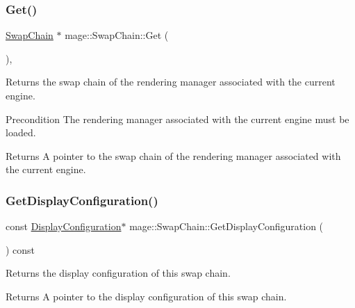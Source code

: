 \subsubsection{\texorpdfstring{Get()}{Get()}}
{\footnotesize\ttfamily \hyperlink{classmage_1_1_swap_chain}{Swap\+Chain} $\ast$ mage\+::\+Swap\+Chain\+::\+Get (\begin{DoxyParamCaption}{ }\end{DoxyParamCaption})\hspace{0.3cm}{\ttfamily [static]}, {\ttfamily [noexcept]}}

Returns the swap chain of the rendering manager associated with the current engine.

\begin{DoxyPrecond}{Precondition}
The rendering manager associated with the current engine must be loaded. 
\end{DoxyPrecond}
\begin{DoxyReturn}{Returns}
A pointer to the swap chain of the rendering manager associated with the current engine. 
\end{DoxyReturn}
\hypertarget{classmage_1_1_swap_chain_afb7cf408081f09d0241f3e764a047e74}{}\label{classmage_1_1_swap_chain_afb7cf408081f09d0241f3e764a047e74} 
\subsubsection{\texorpdfstring{Get\+Display\+Configuration()}{GetDisplayConfiguration()}}
{\footnotesize\ttfamily const \hyperlink{classmage_1_1_display_configuration}{Display\+Configuration}$\ast$ mage\+::\+Swap\+Chain\+::\+Get\+Display\+Configuration (\begin{DoxyParamCaption}{ }\end{DoxyParamCaption}) const\hspace{0.3cm}{\ttfamily [noexcept]}}

Returns the display configuration of this swap chain.

\begin{DoxyReturn}{Returns}
A pointer to the display configuration of this swap chain. 
\end{DoxyReturn}
\hypertarget{classmage_1_1_swap_chain_a0b54dff5a39f10d9073bdbb1121a6144}{}\label{classmage_1_1_swap_chain_a0b54dff5a39f10d9073bdbb1121a6144} 
